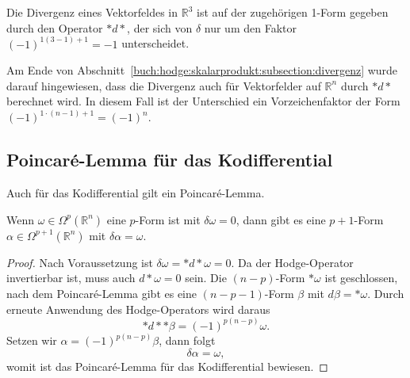 Die Divergenz eines Vektorfeldes in $\mathbb{R}^3$ ist auf der
zugehörigen 1-Form gegeben durch den Operator ${\ast}d{\ast}$,
der sich von $\delta$ nur um den Faktor $(-1)^{1(3-1)+1}=-1$
unterscheidet.

Am Ende von Abschnitt~\ref{buch:hodge:skalarprodukt:subsection:divergenz}
wurde darauf hingewiesen, dass die Divergenz auch für Vektorfelder
auf $\mathbb{R}^n$ durch ${\ast}d{\ast}$ berechnet wird.
In diesem Fall ist der Unterschied ein Vorzeichenfaktor der Form
$(-1)^{1\cdot(n-1)+1}=(-1)^n$.

%
%
\subsection{Poincaré-Lemma für das Kodifferential}
Auch für das Kodifferential gilt ein Poincaré-Lemma.

\begin{satz}
Wenn $\omega \in \Omega^p(\mathbb{R}^n)$ eine $p$-Form ist mit
$\delta\omega=0$, dann gibt es eine $p+1$-Form
$\alpha\in\Omega^{p+1}(\mathbb{R}^n)$ mit $\delta\alpha=\omega$.
\end{satz}

\begin{proof}
Nach Voraussetzung ist $\delta \omega = {\ast}d{\ast}\omega = 0$.
Da der Hodge-Operator invertierbar ist, muss auch $d{\ast}\omega=0$
sein.
Die $(n-p)$-Form $\ast\omega$ ist geschlossen, nach dem Poincaré-Lemma
gibt es eine $(n-p-1)$-Form $\beta$ mit $d\beta=\ast\omega$.
Durch erneute Anwendung des Hodge-Operators wird daraus
\[
{\ast}d{\ast} {\ast}\beta = (-1)^{p(n-p)}\omega.
\]
Setzen wir $\alpha=(-1)^{p(n-p)}\beta$, dann folgt
\[
\delta \alpha = \omega,
\]
womit ist das Poincaré-Lemma für das Kodifferential bewiesen.
\end{proof}

